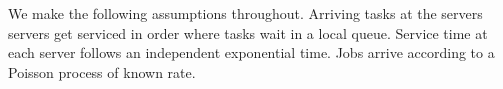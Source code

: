 \documentclass[sigconf,draft]{acmart}
\begin{document}
We make the following assumptions throughout. Arriving tasks at the servers servers get serviced in order where tasks wait in a local queue. Service time at each server follows an independent exponential time. Jobs arrive according to a Poisson process of known rate.

\end{document}
